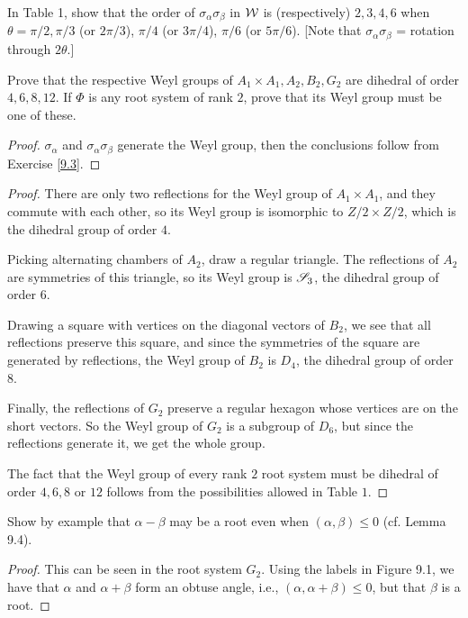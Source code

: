 \begin{ex}\label{9.3}
  In Table 1, show that the order of $\sigma_{\alpha}\sigma_{\beta}$ in ${\cal W}$ is (respectively) $2,3,4,6$ when $\theta=\pi/2, \pi/3$ (or $2\pi/3$), $\pi/4$ (or $3\pi/4$), $\pi/6$ (or $5\pi/6$). [Note that $\sigma_{\alpha}\sigma_{\beta}$ = rotation through $2\theta$.]
\end{ex}

\begin{ex}
  Prove that the respective Weyl groups of $A_1 \times A_1, A_2, B_2, G_2$ are dihedral of order $4,6,8,12$. If $\Phi$ is any root system of rank $2$, prove that its Weyl group must be one of these.
\end{ex}
\begin{proof}
  $\sigma_{\alpha}$ and $\sigma_{\alpha}\sigma_{\beta}$ generate the Weyl group, then the conclusions follow from Exercise \ref{9.3}.
\end{proof}
\begin{proof}
  There are only two reflections for the Weyl group of $A_1\times A_1$, and they commute with each other, so its Weyl group is isomorphic to $Z/2\times Z/2$, which is the dihedral group of order $4$.

  Picking alternating chambers of $A_2$, draw a regular triangle. The reflections of $A_2$ are symmetries of this triangle, so its Weyl group is $\mathscr{S}_3$, the dihedral group of order $6$.

  Drawing a square with vertices on the diagonal vectors of $B_2$, we see that all reflections preserve this square, and since the symmetries of the square are generated by reflections, the Weyl group of $B_2$ is $D_4$, the dihedral group of order $8$.

  Finally, the reflections of $G_2$ preserve a regular hexagon whose vertices are on the short vectors. So the Weyl group of $G_2$ is a subgroup of $D_6$, but since the reflections generate it, we get the whole group.

  The fact that the Weyl group of every rank $2$ root system must be dihedral of order $4, 6, 8$ or $12$ follows from the possibilities allowed in Table $1$.
\end{proof}

\begin{ex}
  Show by example that $\alpha-\beta$ may be a root even when $(\alpha,\beta) \leqslant 0$ (cf. Lemma 9.4).
\end{ex}
\begin{proof}
  This can be seen in the root system $G_2$. Using the labels in Figure 9.1, we have that $\alpha$ and $\alpha+\beta$ form an obtuse angle, i.e., $(\alpha,\alpha+\beta)\leqslant0$, but that $\beta$ is a root.
\end{proof}


